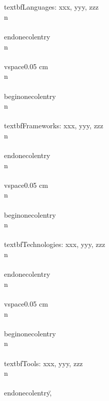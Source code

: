 {\\\\textbf{Languages:} xxx, yyy, zzz\\n        \\\\end{onecolentry}\\n        \\\\vspace{0.05 cm}\\n        \\\\begin{onecolentry}\\n            \\\\textbf{Frameworks:} xxx, yyy, zzz\\n        \\\\end{onecolentry}\\n        \\\\vspace{0.05 cm}\\n        \\\\begin{onecolentry}\\n            \\\\textbf{Technologies:} xxx, yyy, zzz\\n        \\\\end{onecolentry}\\n        \\\\vspace{0.05 cm}\\n        \\\\begin{onecolentry}\\n            \\\\textbf{Tools:} xxx, yyy, zzz\\n        \\\\end{onecolentry}\",
  
}
